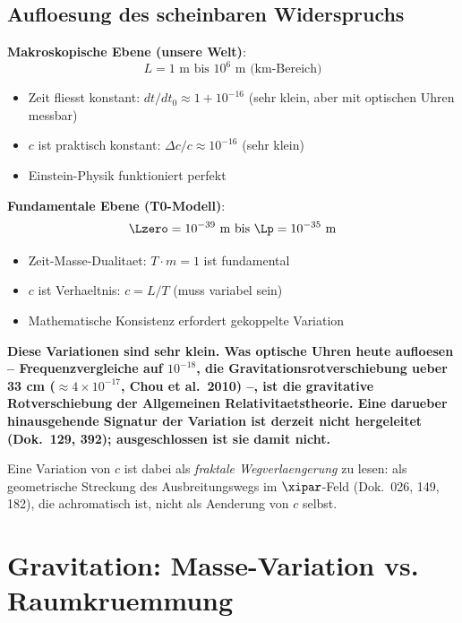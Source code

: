 	\subsection{Aufloesung des scheinbaren Widerspruchs}
	
	\textbf{Makroskopische Ebene (unsere Welt)}:
	\begin{equation}
		L = 1 \text{ m bis } 10^6 \text{ m (km-Bereich)}
	\end{equation}
	
	\begin{itemize}
		\item Zeit fliesst konstant: $dt/dt_0 \approx 1 + 10^{-16}$ (sehr klein, aber mit optischen Uhren messbar)
		\item $c$ ist praktisch konstant: $\Delta c/c \approx 10^{-16}$ (sehr klein)
		\item Einstein-Physik funktioniert perfekt
	\end{itemize}
	
	\textbf{Fundamentale Ebene (T0-Modell)}:
	\begin{equation}
		\Lzero = 10^{-39} \text{ m bis } \Lp = 10^{-35} \text{ m}
	\end{equation}
	
	\begin{itemize}
		\item Zeit-Masse-Dualitaet: $T \cdot m = 1$ ist fundamental
		\item $c$ ist Verhaeltnis: $c = L/T$ (muss variabel sein)
		\item Mathematische Konsistenz erfordert gekoppelte Variation
	\end{itemize}
	
	\textbf{Diese Variationen sind sehr klein. Was optische Uhren heute aufloesen -- Frequenzvergleiche auf $10^{-18}$, die Gravitationsrotverschiebung ueber 33 cm ($\approx 4 \times 10^{-17}$, Chou et al.\ 2010) --, ist die gravitative Rotverschiebung der Allgemeinen Relativitaetstheorie. Eine darueber hinausgehende Signatur der Variation ist derzeit nicht hergeleitet (Dok.~129, 392); ausgeschlossen ist sie damit nicht.}
	
	Eine Variation von $c$ ist dabei als \emph{fraktale Wegverlaengerung} zu lesen: als geometrische Streckung des Ausbreitungswegs im $\xipar$-Feld (Dok.~026, 149, 182), die achromatisch ist, nicht als Aenderung von $c$ selbst.
	
	\section{Gravitation: Masse-Variation vs. Raumkruemmung}
	
